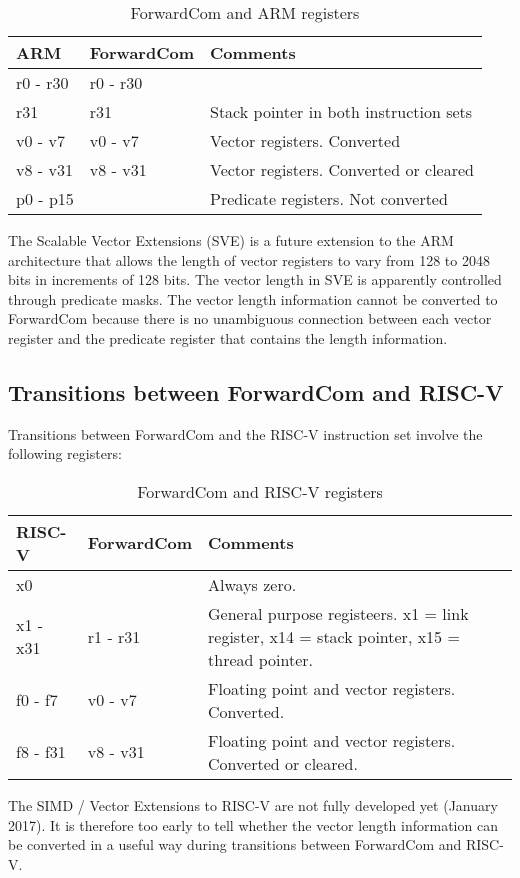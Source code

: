 \documentclass[forwardcom.tex]{subfiles}
\begin{document}
\begin{longtable} {|p{20mm}|p{20mm}|p{80mm}|}
\caption{ForwardCom and ARM registers} 
\label{table:ForwardComAndARMRegisters}
\\
\endfirsthead
\endhead
\hline
\bfseries ARM & \bfseries ForwardCom & \bfseries Comments  \\
\hline
r0 - r30 & r0 - r30 &   \\ 
\hline
r31 & r31 & Stack pointer in both instruction sets \\
\hline
v0 - v7 & v0 - v7 & Vector registers. Converted \\ 
\hline
v8 - v31 & v8 - v31 & Vector registers. Converted or cleared \\
\hline
p0 - p15 &  & Predicate registers. Not converted \\
\hline
\end{longtable}

\vv
The Scalable Vector Extensions (SVE) is a future extension to the ARM architecture that 
allows the length of vector registers to vary from 128 to 2048 bits in increments of 128 bits. The vector length in SVE is apparently controlled through predicate masks. The vector length information cannot be converted to ForwardCom because there is no unambiguous connection between each vector register and the predicate register that contains the length information.

\subsection{Transitions between ForwardCom and RISC-V}

Transitions between ForwardCom and the RISC-V instruction set involve the following registers:

\begin{longtable} {|p{20mm}|p{20mm}|p{80mm}|}
\caption{ForwardCom and RISC-V registers} 
\label{table:ForwardComAndRISCVRegisters}
\\
\endfirsthead
\endhead
\hline
\bfseries RISC-V & \bfseries ForwardCom & \bfseries Comments  \\
\hline
x0 &  &  Always zero. \\
\hline
x1 - x31 & r1 - r31 & General purpose registeers. x1 = link register,
x14 = stack pointer, x15 = thread pointer. \\
\hline
f0 - f7 & v0 - v7 & Floating point and vector registers. Converted. \\ 
\hline
f8 - f31 & v8 - v31 & Floating point and vector registers. Converted or cleared. \\
\hline
\end{longtable}

\vv
The SIMD / Vector Extensions to RISC-V are not fully developed yet (January 2017). It is therefore too early to tell whether the vector length information can be converted in a useful way during transitions between ForwardCom and RISC-V.
\end{document}
